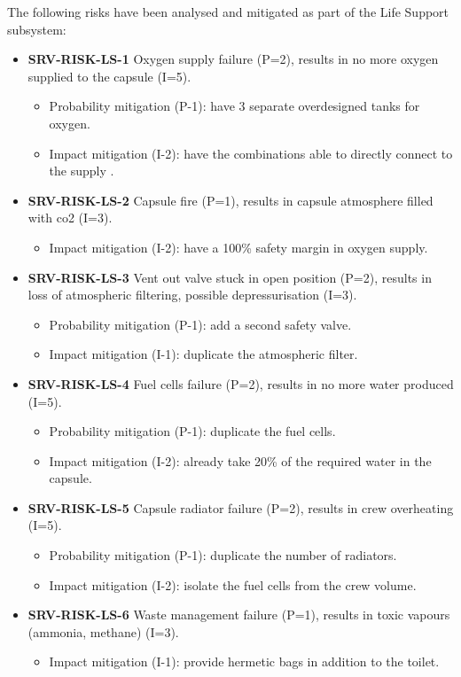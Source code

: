 \noindent The following risks have been analysed and mitigated as part of the Life Support subsystem:

\begin{itemize}
	 \item \textbf{SRV-RISK-LS-1} Oxygen supply failure (P=2), results in no more oxygen supplied to the capsule (I=5).
	\begin{itemize}
		 \item Probability mitigation (P-1): have 3 separate overdesigned tanks for oxygen.		 \item Impact mitigation (I-2): have the combinations able to directly connect to the supply .	\end{itemize}
	 \item \textbf{SRV-RISK-LS-2} Capsule fire (P=1), results in capsule atmosphere filled with co2 (I=3).
	\begin{itemize}
		 \item Impact mitigation (I-2): have a 100\% safety margin in oxygen supply.	\end{itemize}
	 \item \textbf{SRV-RISK-LS-3} Vent out valve stuck in open position (P=2), results in loss of atmospheric filtering, possible depressurisation (I=3).
	\begin{itemize}
		 \item Probability mitigation (P-1): add a second safety valve.		 \item Impact mitigation (I-1): duplicate the atmospheric filter.	\end{itemize}
	 \item \textbf{SRV-RISK-LS-4} Fuel cells failure (P=2), results in no more water produced (I=5).
	\begin{itemize}
		 \item Probability mitigation (P-1): duplicate the fuel cells.		 \item Impact mitigation (I-2): already take 20\% of the required water in the capsule.	\end{itemize}
	 \item \textbf{SRV-RISK-LS-5} Capsule radiator failure (P=2), results in crew overheating (I=5).
	\begin{itemize}
		 \item Probability mitigation (P-1): duplicate the number of radiators.		 \item Impact mitigation (I-2): isolate the fuel cells  from the crew volume.	\end{itemize}
	 \item \textbf{SRV-RISK-LS-6} Waste management failure (P=1), results in toxic vapours (ammonia, methane) (I=3).
	\begin{itemize}
		 \item Impact mitigation (I-1): provide hermetic bags in addition to the toilet.	\end{itemize}
\end{itemize}

